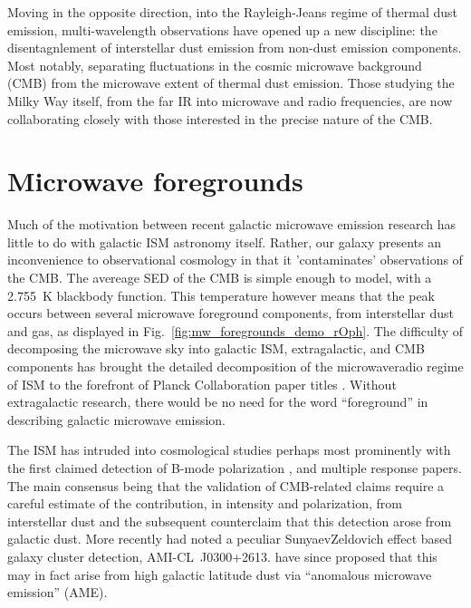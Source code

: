     Moving in the opposite direction, into the Rayleigh-Jeans regime of thermal dust emission, multi-wavelength observations have opened up a new discipline: the disentagnlement of interstellar dust emission from non-dust emission components. Most notably, separating fluctuations in the cosmic microwave background (CMB) from the microwave extent of thermal dust emission. Those studying the Milky Way itself, from the far IR into microwave and radio frequencies, are now collaborating closely with those interested in the precise nature of the CMB.

\section{Microwave foregrounds}

    Much of the motivation between recent galactic microwave emission research has little to do with galactic ISM astronomy itself. Rather, our galaxy presents an inconvenience to observational cosmology in that it 'contaminates' observations of the CMB. The avereage SED of the CMB is simple enough to model, with a 2.755~K blackbody function. This temperature however means that the peak occurs between several microwave foreground components, from interstellar dust and gas, as displayed in Fig.~\ref{fig:mw_foregrounds_demo_rOph}. The difficulty of decomposing the microwave sky into galactic ISM, extragalactic, and CMB components has brought the detailed decomposition of the microwave\-radio regime of ISM to the forefront of Planck Collaboration paper titles \citep{planckEarly11I,planck2013I,planck2015I}. Without extragalactic research, there would be no need for the word ``foreground'' in describing galactic microwave emission.

    The ISM has intruded into cosmological studies perhaps most prominently with the first claimed detection of B-mode polarization \citep{hanson13, bicep214, flauger14}, and multiple response papers. The main consensus being that the validation of CMB-related claims require a careful estimate of the contribution, in intensity and polarization, from interstellar dust and the subsequent counter\-claim that this detection arose from galactic dust\citep{planckIntL17, sheehy17}. More recently \cite{shimwell12} had noted a peculiar Sunyaev\-Zeldovich effect based galaxy cluster detection, AMI-CL~J0300+2613. \cite{perrott18} have since proposed that this may in fact arise from high galactic latitude dust via ``anomalous microwave emission'' (AME).

